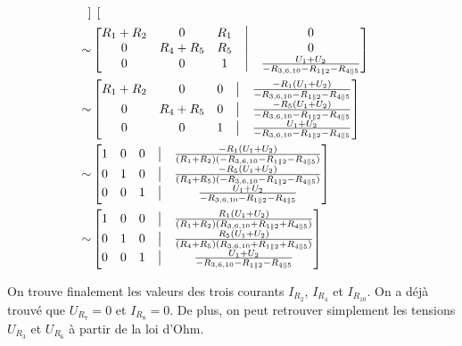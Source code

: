 \documentclass{article}
\begin{document}
\begin{align*}
\begin{bmatrix}
\end{bmatrix} \\
\sim
&\begin{bmatrix}
    R_1 + R_2 & 0 & R_1 & \bigm| & 0\\
    0 & R_4 + R_5 & R_5 & \bigm| & 0 \\
    0 & 0 & 1 & \bigm| & \frac{U_1+U_2}{-R_{3,6,10} - R_{1\parallel 2} - R_{4\parallel 5}}\\
\end{bmatrix} \\
\sim
&\begin{bmatrix}
    R_1 + R_2 & 0 & 0 & \bigm| & \frac{-R_1(U_1+U_2)}{-R_{3,6,10} - R_{1\parallel 2} - R_{4\parallel 5}}\\
    0 & R_4 + R_5 & 0 & \bigm| & \frac{-R_5(U_1+U_2)}{-R_{3,6,10} - R_{1\parallel 2} - R_{4\parallel 5}} \\
    0 & 0 & 1 & \bigm| & \frac{U_1+U_2}{-R_{3,6,10} - R_{1\parallel 2} - R_{4\parallel 5}}\\
\end{bmatrix} \\
\sim
&\begin{bmatrix}
    1 & 0 & 0 & \bigm| & \frac{-R_1(U_1+U_2)}{(R_1+R_2)(-R_{3,6,10} - R_{1\parallel 2} - R_{4\parallel 5})}\\
    0 & 1 & 0 & \bigm| & \frac{-R_5(U_1+U_2)}{(R_4+R_5)(-R_{3,6,10} - R_{1\parallel 2} - R_{4\parallel 5})} \\
    0 & 0 & 1 & \bigm| & \frac{U_1+U_2}{-R_{3,6,10} - R_{1\parallel 2} - R_{4\parallel 5}}\\
\end{bmatrix} \\
\sim
&\begin{bmatrix}
    1 & 0 & 0 & \bigm| & \frac{R_1(U_1+U_2)}{(R_1+R_2)(R_{3,6,10} + R_{1\parallel 2} + R_{4\parallel 5})}\\
    0 & 1 & 0 & \bigm| & \frac{R_5(U_1+U_2)}{(R_4+R_5)(R_{3,6,10} + R_{1\parallel 2} + R_{4\parallel 5})} \\
    0 & 0 & 1 & \bigm| & \frac{U_1+U_2}{-R_{3,6,10} - R_{1\parallel 2} - R_{4\parallel 5}}\\
\end{bmatrix} \\
\end{align*}

On trouve finalement les valeurs des trois courants $I_{R_2}$, $I_{R_4}$ et $I_{R_{10}}$. On a déjà trouvé que $U_{R_7}=0$ et $I_{R_8}=0$. De plus, on peut retrouver simplement les tensions $U_{R_3}$ et $U_{R_6}$ à partir de la loi d'Ohm.
\end{document}
